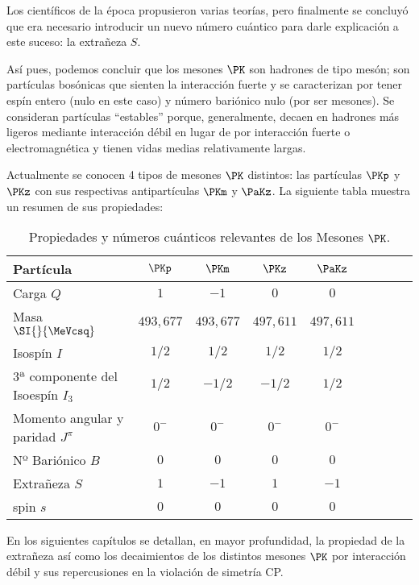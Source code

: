 Los científicos de la época propusieron varias teorías, pero finalmente se concluyó que era necesario introducir un nuevo número cuántico para darle explicación a este suceso: la extrañeza $S$. 

Así pues, podemos concluir que los mesones $\PK$ son hadrones de tipo mesón; son partículas bosónicas que sienten la interacción fuerte y se caracterizan por tener espín entero (nulo en este caso) y número bariónico nulo (por ser mesones). Se consideran partículas ``estables'' porque, generalmente, decaen en hadrones más ligeros mediante interacción débil en lugar de por interacción fuerte o electromagnética y tienen vidas medias relativamente largas.

Actualmente se conocen 4 tipos de mesones $\PK$ distintos: las partículas $\PKp$ y $\PKz$ con sus respectivas antipartículas $\PKm$ y $\PaKz$. La siguiente tabla muestra un resumen de sus propiedades:\\

\begin{table}[h]
	\centering
	\begin{tabular}{l*{7}{c}r}
\hline
Partícula & $\PKp$ & $\PKm$ & $\PKz$ & $\PaKz$ \\ 
\hline
Carga $Q$ & $1$ & $-1$ & $0$ & $0$\\
Masa $\SI{}{\MeVcsq}$ & $493,677$ & $493,677$ & $497,611$ & $497,611$\\
Isospín $I$ & $1/2$ & $1/2$ & $1/2$ & $1/2$ \\
3ª componente del Isoespín $I_3$ & $1/2$ & $-1/2$ & $-1/2$ & $1/2$ \\
Momento angular y paridad $J^\pi$ & $0^-$ & $0^-$ & $0^-$ & $0^-$ \\
Nº Bariónico $B$ & $0$ & $0$ & $0$ & $0$\\
Extrañeza $S$ & $1$ & $-1$ & $1$ & $-1$\\
spin $s$ & $0$ & $0$ & $0$ & $0$\\ 
\hline
	\end{tabular}
\caption[Propiedades y números cuánticos relevantes de los Mesones $\PK$]{Propiedades y números cuánticos relevantes de los Mesones $\PK$.\protect\footnotemark}
\label{tab:propiedades}
\end{table}


En los siguientes capítulos se detallan, en mayor profundidad, la propiedad de la extrañeza así como los decaimientos de los distintos mesones $\PK$ por interacción débil y sus repercusiones en la violación de simetría CP.
